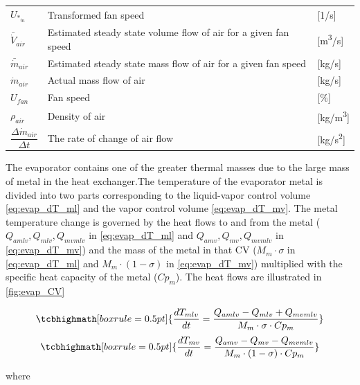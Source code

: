 \begin{center}
	\begin{tabular}{l p{8cm} l}
		$ 	U_{*_{\dot{m}}} $ 						& Transformed fan speed												& [1/\si{s}]\\
		$\bar{\dot{V}}_{air}$						& Estimated steady state volume flow of air for a given fan speed 	& [\si{m^3}/\si{s}] \\
		$\bar{\dot{m}}_{air}$						& Estimated steady state mass flow of air for a given fan speed 	& [\si{kg}/\si{s}] \\
		$\dot{m}_{air}$								& Actual mass flow of air					  						& [\si{kg}/\si{s}] \\
		$U_{fan}$									& Fan speed 														& [$\%$] \\
		$\rho_{air}$								& Density of air													& [\si{kg}/\si{m^3}] \\[0.2cm]
		$\dfrac{\Delta \dot{m}_{air}}{\Delta t} $ 	& The rate of change of	air flow 									& [\si{kg}/\si{s^2}]
	\end{tabular}
\end{center}

The evaporator contains one of the greater thermal masses due to the large mass of metal in the heat exchanger.The temperature of the evaporator metal is divided into two parts corresponding to the liquid-vapor control volume \cref{eq:evap_dT_ml} and the vapor control volume \cref{eq:evap_dT_mv}. The metal temperature change is governed by the heat flows to and from the metal ($ Q_{amlv}, Q_{mlv}, Q_{mvmlv} $ in \cref{eq:evap_dT_ml} and $ Q_{amv}, Q_{mv}, Q_{mvmlv} $ in \cref{eq:evap_dT_mv}) and the mass of the metal in that CV ($M_m \cdot \sigma$ in \cref{eq:evap_dT_ml} and $M_m \cdot (1 - \sigma)$ in \cref{eq:evap_dT_mv}) multiplied with the specific heat capacity of the metal ($Cp_m$). The heat flows are illustrated in \cref{fig:evap_CV}


\begin{equation}
	\tcbhighmath[boxrule = 0.5pt]{ 	\frac{dT_{mlv}}{dt}  = \frac{Q_{amlv}-Q_{mlv} + Q_{mvmlv}}{M_m \cdot \sigma \cdot Cp_m}  }    \label{eq:evap_dT_ml}        
\end{equation}
\begin{equation}
	\tcbhighmath[boxrule = 0.5pt]{ \frac{dT_{mv}}{dt} = \frac{Q_{amv} - Q_{mv} - Q_{mvmlv}}{M_m \cdot (1 - \sigma) \cdot Cp_m } }     \label{eq:evap_dT_mv}       
\end{equation}



where

